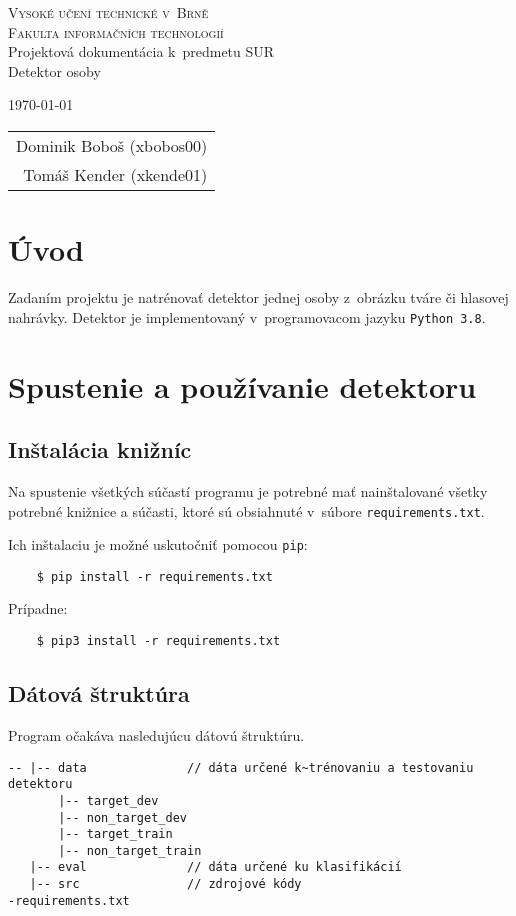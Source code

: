 \documentclass[11pt, a4paper]{article}
\begin{document}
	\begin{titlepage}
		\begin{center}
			\Huge
			\textsc{Vysoké učení technické v~Brně} \\
			\huge
			\textsc{Fakulta informačních technologií} \\
			\LARGE
			Projektová dokumentácia k~predmetu SUR \\
			\Huge
			Detektor osoby
		\end{center}

		{\Large
			\today
			\hfill
			\begin{tabular}{r}
			Dominik Boboš (xbobos00) \\
			Tomáš Kender (xkende01)
			\end{tabular}
		}
	\end{titlepage}
	
	\section{Úvod}
	Zadaním projektu je natrénovať detektor jednej osoby z~obrázku tváre či hlasovej nahrávky. Detektor je implementovaný v~programovacom jazyku \texttt{Python\,3.8}. 
	
	\section{Spustenie a používanie detektoru}
		\subsection{Inštalácia knižníc}
	Na spustenie všetkých súčastí programu je potrebné mať nainštalované všetky potrebné knižnice a súčasti, ktoré sú obsiahnuté v~súbore \texttt{requirements.txt}. 
	
	Ich inštalaciu je možné uskutočniť pomocou \texttt{pip}:
			\begin{verbatim}
    $ pip install -r requirements.txt
			\end{verbatim}
			
	Prípadne:
			\begin{verbatim}
    $ pip3 install -r requirements.txt
			\end{verbatim}
			
		\subsection{Dátová štruktúra}
	Program očakáva nasledujúcu dátovú štruktúru.
			\begin{verbatim}
-- |-- data              // dáta určené k~trénovaniu a testovaniu detektoru
       |-- target_dev
       |-- non_target_dev
       |-- target_train
       |-- non_target_train
   |-- eval              // dáta určené ku klasifikácií
   |-- src               // zdrojové kódy 
-requirements.txt
			\end{verbatim}
			
\end{document}
